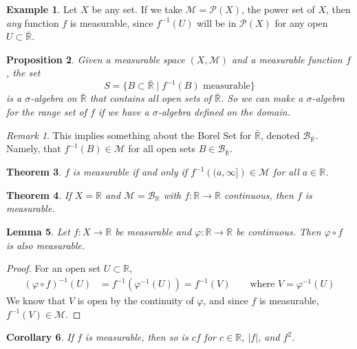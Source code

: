 \documentclass[12pt]{article}
\theoremstyle{plain}
\newtheorem{thm}{Theorem}[subsection]
\newtheorem{lem}[thm]{Lemma}
\newtheorem{prop}[thm]{Proposition}
\newtheorem{cor}[thm]{Corollary}
\theoremstyle{definition}
\newtheorem{ex}[thm]{Example}
\theoremstyle{remark}
\newtheorem*{rmk}{Remark}
\begin{document}
\begin{ex}
Let $X$ be any set. If we take $\mathscr{M} = \mathscr{P}(X)$, the power set of $X$, then \emph{any} function $f$ is measurable, since $f^{-1}(U)$ will be in $\mathscr{P}(X)$ for any open $U\subset \bar{\mathbb{R}}$.
\end{ex}

\begin{prop}
Given a measurable space $(X,\mathscr{M})$ and a measurable function $f$, the set
\[
    S = \{B \subset \bar{\mathbb{R}} \; | \; f^{-1}(B) 
    \text{ measurable} \}
\]
is a $\sigma$-algebra on $\bar{\mathbb{R}}$ that contains all open sets of $\bar{\mathbb{R}}$. So we can make a $\sigma$-algebra for the range set of $f$ if we have a $\sigma$-algebra defined on the domain.
\end{prop}

\begin{rmk}
This implies something about the Borel Set for $\bar{\mathbb{R}}$, denoted $\mathscr{B}_{\bar{\mathbb{R}}}$. Namely, that $f^{-1}(B)\in \mathscr{M}$ for all open sets $B\in\mathscr{B}_{\bar{\mathbb{R}}}$.
\end{rmk}

\begin{thm}
\label{measequiv}
$f$ is measurable if and only if $f^{-1}\left((a,\infty]\right)\in\mathscr{M}$ for all $a\in\mathbb{R}$. 
\end{thm}

\begin{thm}
If $X=\mathbb{R}$ and $\mathscr{M}=\mathscr{B}_\mathbb{R}$ with $f:\mathbb{R}\rightarrow\mathbb{R}$ continuous, then $f$ is measurable.
\end{thm}

\begin{lem}
Let $f:X\rightarrow\mathbb{R}$ be measurable and $\varphi: \mathbb{R}\rightarrow\mathbb{R}$ be continuous. Then $\varphi\circ f$ is also measurable.
\end{lem}
\begin{proof}
For an open set $U\subset\mathbb{R}$, 
\begin{align*}
    (\varphi\circ f)^{-1}(U) &= 
        f^{-1}\left(\varphi^{-1}(U)\right)
    = f^{-1}(V) \qquad \text{where }V = \varphi^{-1}(U)
\end{align*}
We know that $V$ is open by the continuity of $\varphi$, and since $f$ is measurable, $f^{-1}(V)\in\mathscr{M}$.
\end{proof}

\begin{cor}
If $f$ is measurable, then so is $c f$ for $c\in\mathbb{R}$, $|f|$, and $f^2$.
\end{cor}
\end{document}
